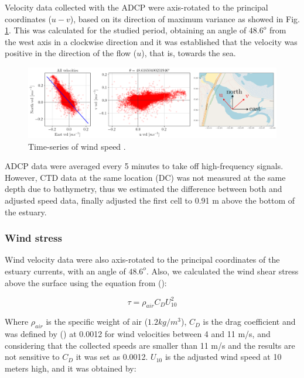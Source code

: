 \documentclass[11pt,letterpaper]{article}
\begin{document}
Velocity data collected with the ADCP were axis-rotated to the principal coordinates ($u-v$), based on its direction of maximum variance as showed in Fig. \ref{fig:rotacion}. This was calculated for the studied period, obtaining an angle of $48.6^o$ from the west axis in a clockwise direction and it was established that the velocity was positive in the direction of the flow ($u$), that is, towards the sea.  \\

\begin{figure}[h!]
    \centering
    \includegraphics[width=\textwidth]{Imagenes/rotacion.png}
    \caption{Time-series of wind speed .}
    \label{fig:rotacion}
\end{figure}

ADCP data were averaged every 5 minutes to take off high-frequency signals. However, CTD data at the same location (DC) was not measured at the same depth due to bathymetry, thus we estimated the difference between both and adjusted speed data, finally adjusted the first cell to 0.91 m above the bottom of the estuary. \\

\subsubsection{Wind stress}

Wind velocity data were also axis-rotated to the principal coordinates of the estuary currents, with an angle of $48.6^o$. Also, we calculated the wind shear stress above the surface using the equation from \citeauthor{read2011derivation} (\cite*{read2011derivation}): 

\begin{equation}
    \tau=\rho_{air} C_D U_{10}^2
    \label{eq: tau}
\end{equation}

Where $\rho_{air}$ is the specific weight of air ($1.2 kg/m^3$), $C_D$ is the drag coefficient and was defined by \citeauthor{large1981open} (\cite*{large1981open}) at 0.0012 for wind velocities between 4 and 11 m/s, and considering that the collected speeds are smaller than 11 m/s and the results are not sensitive to $C_D$ it was set as 0.0012. $U_{10}$ is the adjusted wind speed at 10 meters high, and it was obtained by: 
\end{document}

